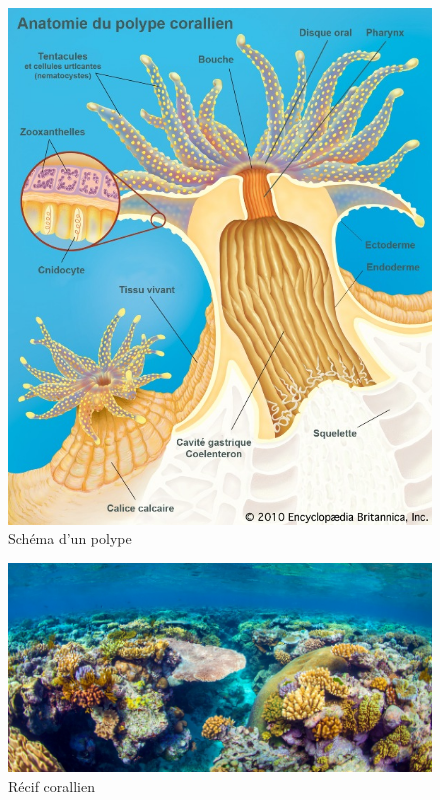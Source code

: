 \documentclass[]{report}
\begin{document}
\begin{figure}
\centering
\includegraphics[width=12.00000cm]{../image/polype_schema.jpg}
\caption{Schéma d'un polype}
\end{figure}

\begin{figure}
\centering
\includegraphics{../image/recif2.jpg}
\caption{Récif corallien}
\end{figure}
\end{document}
